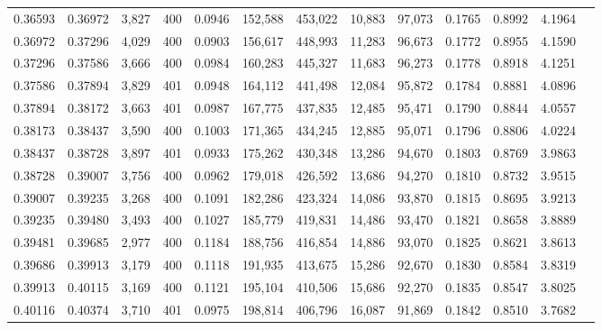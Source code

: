 \begin{tabular}{rrrrrrrrrrrrr}
0.36593 & 0.36972 & 3,827 & 400 &                                     0.0946 & 152,588 & 453,022 &  10,883 &  97,073 & 0.1765 & 0.8992 & 4.1964 \\
0.36972 & 0.37296 & 4,029 & 400 &                                     0.0903 & 156,617 & 448,993 &  11,283 &  96,673 & 0.1772 & 0.8955 & 4.1590 \\
0.37296 & 0.37586 & 3,666 & 400 &                                     0.0984 & 160,283 & 445,327 &  11,683 &  96,273 & 0.1778 & 0.8918 & 4.1251 \\
0.37586 & 0.37894 & 3,829 & 401 &                                     0.0948 & 164,112 & 441,498 &  12,084 &  95,872 & 0.1784 & 0.8881 & 4.0896 \\
0.37894 & 0.38172 & 3,663 & 401 &                                     0.0987 & 167,775 & 437,835 &  12,485 &  95,471 & 0.1790 & 0.8844 & 4.0557 \\
0.38173 & 0.38437 & 3,590 & 400 &                                     0.1003 & 171,365 & 434,245 &  12,885 &  95,071 & 0.1796 & 0.8806 & 4.0224 \\
0.38437 & 0.38728 & 3,897 & 401 &                                     0.0933 & 175,262 & 430,348 &  13,286 &  94,670 & 0.1803 & 0.8769 & 3.9863 \\
0.38728 & 0.39007 & 3,756 & 400 &                                     0.0962 & 179,018 & 426,592 &  13,686 &  94,270 & 0.1810 & 0.8732 & 3.9515 \\
0.39007 & 0.39235 & 3,268 & 400 &                                     0.1091 & 182,286 & 423,324 &  14,086 &  93,870 & 0.1815 & 0.8695 & 3.9213 \\
0.39235 & 0.39480 & 3,493 & 400 &                                     0.1027 & 185,779 & 419,831 &  14,486 &  93,470 & 0.1821 & 0.8658 & 3.8889 \\
0.39481 & 0.39685 & 2,977 & 400 &                                     0.1184 & 188,756 & 416,854 &  14,886 &  93,070 & 0.1825 & 0.8621 & 3.8613 \\
0.39686 & 0.39913 & 3,179 & 400 &                                     0.1118 & 191,935 & 413,675 &  15,286 &  92,670 & 0.1830 & 0.8584 & 3.8319 \\
0.39913 & 0.40115 & 3,169 & 400 &                                     0.1121 & 195,104 & 410,506 &  15,686 &  92,270 & 0.1835 & 0.8547 & 3.8025 \\
0.40116 & 0.40374 & 3,710 & 401 &                                     0.0975 & 198,814 & 406,796 &  16,087 &  91,869 & 0.1842 & 0.8510 & 3.7682 \\

\end{tabular}

